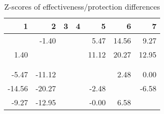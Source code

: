 \begin{table}[ht]
\centering
\begin{tabular}{rrrrrrr}
  \hline
1 & 2 & 3 & 4 & 5 & 6 & 7 \\ 
  \hline
 & -1.40 &  &  & 5.47 & 14.56 & 9.27 \\ 
  1.40 &  &  &  & 11.12 & 20.27 & 12.95 \\ 
   &  &  &  &  &  &  \\ 
   &  &  &  &  &  &  \\ 
  -5.47 & -11.12 &  &  &  & 2.48 & 0.00 \\ 
  -14.56 & -20.27 &  &  & -2.48 &  & -6.58 \\ 
  -9.27 & -12.95 &  &  & -0.00 & 6.58 &  \\ 
   \hline
\end{tabular}
\caption{Z-scores of effectiveness/protection differences} 
\end{table}
